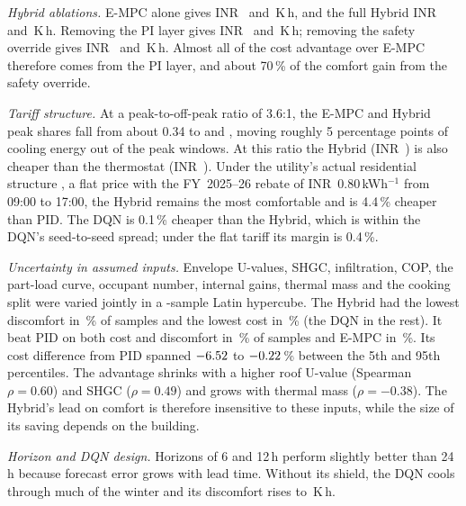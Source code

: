 \emph{Hybrid ablations.} E-MPC alone gives INR~\SBaseCostMpc{} and \SBaseKhMpc\,K\,h,
and the full Hybrid INR~\SBaseCostHyb{} and \SBaseKhHyb\,K\,h. Removing the PI layer
gives INR~\SNoPICostHyb{} and \SNoPIKhHyb\,K\,h; removing the safety override gives
INR~\SNoSafeCostHyb{} and \SNoSafeKhHyb\,K\,h. Almost all of the cost advantage over
E-MPC therefore comes from the PI layer, and about 70\,\% of the comfort gain from the
safety override.

\emph{Tariff structure.} At a peak-to-off-peak ratio of 3.6:1, the E-MPC and Hybrid peak
shares fall from about 0.34 to \SSteepPkShMpc{} and \SSteepPkShHyb{}, moving roughly 5
percentage points of cooling energy out of the peak windows. At this ratio the Hybrid
(INR~\SSteepCostHyb) is also cheaper than the thermostat (INR~\SSteepCostTh). Under the utility's actual
residential structure \cite{merc}, a flat price with the FY~2025--26 rebate of INR~0.80\,kWh$^{-1}$
from 09:00 to 17:00, the Hybrid remains the most comfortable and is 4.4\,\% cheaper than
PID. The DQN is 0.1\,\% cheaper than the Hybrid, which is within the DQN's seed-to-seed
spread; under the flat tariff its margin is 0.4\,\%.

\emph{Uncertainty in assumed inputs.} Envelope U-values, SHGC, infiltration, COP, the
part-load curve, occupant number, internal gains, thermal mass and the cooking split were
varied jointly in a \UqN-sample Latin hypercube. The Hybrid had the lowest discomfort in
\UqBestKhHyb\,\% of samples and the lowest cost in \UqBestCostHyb\,\% (the DQN in the
rest). It beat PID on both cost and discomfort in \UqDomHP\,\% of samples and E-MPC in
\UqDomHM\,\%. Its cost difference from PID spanned $-6.52$ to
$-0.22$\,\% between the 5th and 95th percentiles. The advantage shrinks with a
higher roof U-value (Spearman $\rho=0.60$) and SHGC ($\rho=0.49$) and grows with thermal
mass ($\rho=-0.38$). The Hybrid's lead on comfort is therefore insensitive to these
inputs, while the size of its saving depends on the building.

\emph{Horizon and DQN design.} Horizons of 6 and 12\,h perform slightly better than
24\,h because forecast error grows with lead time. Without its shield, the DQN cools
through much of the winter and its discomfort rises to \SNoShieldKhDqn\,K\,h.

